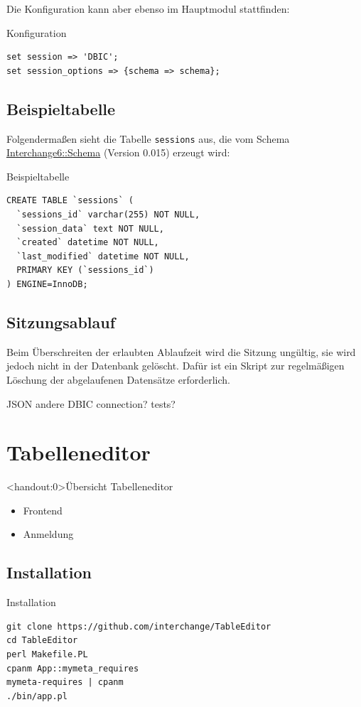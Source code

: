 Die Konfiguration kann aber ebenso im Hauptmodul
stattfinden:

\begin{frame}[fragile]{Konfiguration}
\begin{lstlisting}
set session => 'DBIC';
set session_options => {schema => schema};
\end{lstlisting}
\end{frame}

\subsection{Beispieltabelle}

Folgendermaßen sieht die Tabelle \verb|sessions| aus,
die vom Schema \href{https://metacpan.org/pod/Interchange6::Schema}{Interchange6::Schema} (Version 0.015)
erzeugt wird:

\begin{frame}[fragile]{Beispieltabelle}
\begin{lstlisting}
CREATE TABLE `sessions` (
  `sessions_id` varchar(255) NOT NULL,
  `session_data` text NOT NULL,
  `created` datetime NOT NULL,
  `last_modified` datetime NOT NULL,
  PRIMARY KEY (`sessions_id`)
) ENGINE=InnoDB;
\end{lstlisting}
\end{frame}

\subsection{Sitzungsablauf}

Beim Überschreiten der erlaubten Ablaufzeit wird die Sitzung
ungültig, sie wird jedoch nicht in der Datenbank gelöscht.
Dafür ist ein Skript zur regelmäßigen Löschung der
abgelaufenen Datensätze erforderlich.

JSON
andere DBIC connection?
tests?

\section{Tabelleneditor}

\begin{frame}<handout:0>{Übersicht Tabelleneditor}
\begin{itemize}
\item Frontend
\item Anmeldung
\end{itemize}
\end{frame}

\subsection{Installation}
\begin{frame}[fragile]{Installation}
\begin{lstlisting}
git clone https://github.com/interchange/TableEditor
cd TableEditor
perl Makefile.PL
cpanm App::mymeta_requires
mymeta-requires | cpanm
./bin/app.pl
\end{lstlisting}

\end{frame}

